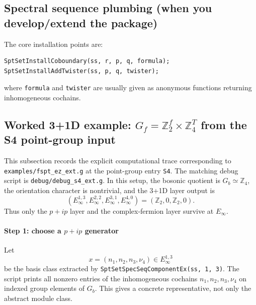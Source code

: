 \documentclass{SciPost}
\begin{document}
\subsection{Spectral sequence plumbing (when you develop/extend the package)}

The core installation points are:
\begin{verbatim}
SptSetInstallCoboundary(ss, r, p, q, formula);
SptSetInstallAddTwister(ss, p, q, twister);
\end{verbatim}
where \texttt{formula} and \texttt{twister} are usually given as anonymous functions returning inhomogeneous cochains.

\subsection{Worked 3+1D example: $G_f=\mathbb Z_2^f \times \mathbb Z_4^T$ from the S4 point-group input}
\label{sec:worked-s4-z2f-z4t}

This subsection records the explicit computational trace corresponding to \texttt{examples/fspt\_ez\_ext.g} at the point-group entry \texttt{S4}.
The matching debug script is \texttt{debug/debug\_s4\_ext.g}.
In this setup, the bosonic quotient is $G_b \simeq \mathbb Z_4$, the orientation character is nontrivial, and the 3+1D layer output is
\begin{equation}
\left(E_\infty^{1,3}, E_\infty^{2,2}, E_\infty^{3,1}, E_\infty^{4,0}\right)
= \left(\mathbb Z_2, 0, \mathbb Z_2, 0\right).
\end{equation}
Thus only the $p+ip$ layer and the complex-fermion layer survive at $E_\infty$.

\paragraph{Step 1: choose a $p+ip$ generator}
Let
\begin{equation}
x = (n_1, n_2, n_3, \nu_4) \in E_\infty^{1,3}
\end{equation}
be the basis class extracted by \texttt{SptSetSpecSeqComponentEx(ss, 1, 3)}.
The script prints all nonzero entries of the inhomogeneous cochains $n_1, n_2, n_3, \nu_4$ on indexed group elements of $G_b$.
This gives a concrete representative, not only the abstract module class.
\end{document}
